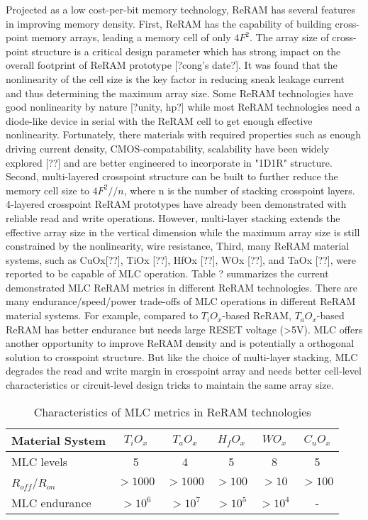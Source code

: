 Projected as a low cost-per-bit memory technology, ReRAM has several features in improving memory density. First, ReRAM has the capability of building cross-point memory arrays, leading a memory cell of only $4F^2$. The array size of cross-point structure is a critical design parameter which has strong impact on the overall footprint of ReRAM prototype [?cong's date?]. It was found that the nonlinearity of the cell size is the key factor in reducing sneak leakage current and thus determining the maximum array size. Some ReRAM technologies have good nonlinearity by nature [?unity, hp?] while most ReRAM technologies need a diode-like device in serial with the ReRAM cell to get enough effective nonlinearity. Fortunately, there materials with required properties such as enough driving current density, CMOS-compatability, scalability have been widely explored [??] and are better engineered to incorporate in "1D1R" structure. Second, multi-layered crosspoint structure can be built to further reduce the memory cell size to $4F^2//n$, where n is the number of stacking crosspoint layers. 4-layered crosspoint ReRAM prototypes have already been demonstrated with reliable read and write operations. However, multi-layer stacking extends the effective array size in the vertical dimension while the maximum array size is still constrained by the nonlinearity, wire resistance, Third, many ReRAM material systems,
such as CuOx[??], TiOx [??], HfOx [??], WOx [??], and TaOx [??], were reported to be capable of MLC operation. Table ? summarizes the current demonstrated MLC ReRAM metrics in different ReRAM technologies. There are many endurance/speed/power trade-offs of MLC operations in different ReRAM material systems. For example, compared to $T_iO_x$-based ReRAM, $T_aO_x$-based ReRAM has better endurance but needs large RESET voltage (>5V). MLC offers another opportunity to improve ReRAM density and is potentially a orthogonal solution to crosspoint structure. But like the choice of multi-layer stacking, MLC degrades the read and write margin in crosspoint array and needs better cell-level characteristics or circuit-level design tricks to maintain the same array size.

\begin{table}[t]
\centering
\caption{Characteristics of MLC metrics in ReRAM technologies}
\vspace{-5pt}
\label{tb:0t1r}
\begin{tabular}{ l | c | c | c | c | c}
\hline\hline
Material System & $T_iO_x$ & $T_aO_x$ & $H_fO_x$ & $WO_x$ & $C_uO_x$\\
\hline
MLC levels & 5 & 4 & 5 & 8 & 5\\
\hline
$R_{off}$/$R_{on}$& $>1000$ & $>1000$ & $>100$ & $>10$ & $>100$\\
\hline
MLC endurance  & $>10^6$ & $>10^7$ & $>10^5$ & $>10^4$ & -\\

\hline\hline
\end{tabular}
\vspace{-10pt}
\end{table}

